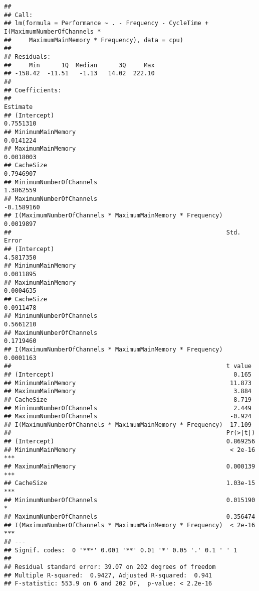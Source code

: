 \documentclass[12pt]{article}
\begin{document}
\begin{verbatim}
## 
## Call:
## lm(formula = Performance ~ . - Frequency - CycleTime + I(MaximumNumberOfChannels * 
##     MaximumMainMemory * Frequency), data = cpu)
## 
## Residuals:
##     Min      1Q  Median      3Q     Max 
## -158.42  -11.51   -1.13   14.02  222.10 
## 
## Coefficients:
##                                                              Estimate
## (Intercept)                                                 0.7551310
## MinimumMainMemory                                           0.0141224
## MaximumMainMemory                                           0.0018003
## CacheSize                                                   0.7946907
## MinimumNumberOfChannels                                     1.3862559
## MaximumNumberOfChannels                                    -0.1589160
## I(MaximumNumberOfChannels * MaximumMainMemory * Frequency)  0.0019897
##                                                            Std. Error
## (Intercept)                                                 4.5817350
## MinimumMainMemory                                           0.0011895
## MaximumMainMemory                                           0.0004635
## CacheSize                                                   0.0911478
## MinimumNumberOfChannels                                     0.5661210
## MaximumNumberOfChannels                                     0.1719460
## I(MaximumNumberOfChannels * MaximumMainMemory * Frequency)  0.0001163
##                                                            t value
## (Intercept)                                                  0.165
## MinimumMainMemory                                           11.873
## MaximumMainMemory                                            3.884
## CacheSize                                                    8.719
## MinimumNumberOfChannels                                      2.449
## MaximumNumberOfChannels                                     -0.924
## I(MaximumNumberOfChannels * MaximumMainMemory * Frequency)  17.109
##                                                            Pr(>|t|)    
## (Intercept)                                                0.869256    
## MinimumMainMemory                                           < 2e-16 ***
## MaximumMainMemory                                          0.000139 ***
## CacheSize                                                  1.03e-15 ***
## MinimumNumberOfChannels                                    0.015190 *  
## MaximumNumberOfChannels                                    0.356474    
## I(MaximumNumberOfChannels * MaximumMainMemory * Frequency)  < 2e-16 ***
## ---
## Signif. codes:  0 '***' 0.001 '**' 0.01 '*' 0.05 '.' 0.1 ' ' 1
## 
## Residual standard error: 39.07 on 202 degrees of freedom
## Multiple R-squared:  0.9427, Adjusted R-squared:  0.941 
## F-statistic: 553.9 on 6 and 202 DF,  p-value: < 2.2e-16
\end{verbatim}
\end{document}
